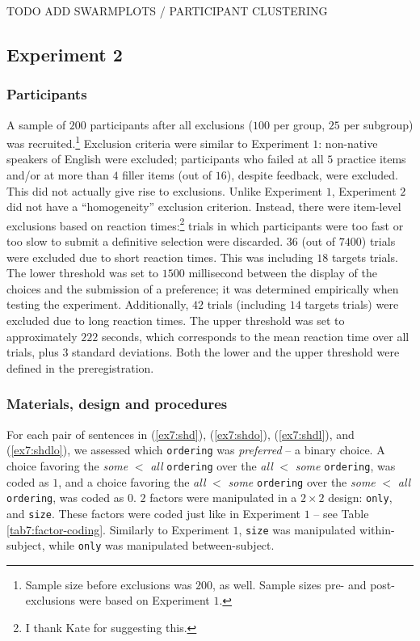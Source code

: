 TODO ADD SWARMPLOTS / PARTICIPANT CLUSTERING

\subsection{Experiment 2} 


\subsubsection{Participants}
A sample of $200$ participants after all exclusions ($100$ per group, $25$ per subgroup) was recruited.\footnote{Sample size before exclusions was $200$, as well. Sample sizes pre- and post-exclusions were based on Experiment $1$.} Exclusion criteria were similar to Experiment $1$: non-native speakers of English were excluded; participants who failed at all $5$ practice items and/or at more than $4$ filler items (out of $16$), despite feedback, were excluded. This did not actually give rise to exclusions. Unlike Experiment $1$, Experiment $2$ did not have a ``homogeneity'' exclusion criterion. Instead, there were item-level exclusions based on reaction times:\footnote{I thank Kate for suggesting this.} trials in which participants were too fast or too slow to submit a definitive selection were discarded. $36$ (out of $7400$) trials were excluded due to short reaction times. This was including $18$ targets trials. The lower threshold was set to $1500$ millisecond between the display of the choices and the submission of a preference; it was determined empirically when testing the experiment. Additionally, $42$ trials (including $14$ targets trials) were excluded due to long reaction times. The upper threshold was set to approximately $222$ seconds, which corresponds to the mean reaction time over all trials, plus $3$ standard deviations. Both the lower and the upper threshold were defined in the preregistration.

\subsubsection{Materials, design and procedures}

For each pair of sentences in (\ref{ex7:shd}), (\ref{ex7:shdo}), (\ref{ex7:shdl}), and (\ref{ex7:shdlo}), we assessed which \texttt{ordering} was \textit{preferred} -- a binary choice. A choice favoring the \textit{some} $<$ \textit{all} \texttt{ordering} over the \textit{all} $<$ \textit{some} \texttt{ordering}, was coded as $1$, and a choice favoring the \textit{all} $<$ \textit{some} \texttt{ordering} over the \textit{some} $<$ \textit{all} \texttt{ordering}, was coded as $0$. $2$ factors were manipulated in  a $2\times2$ design: \texttt{only}, and \texttt{size}. These factors were coded just like in Experiment $1$ -- see Table \ref{tab7:factor-coding}. Similarly to Experiment $1$, \texttt{size} was manipulated within-subject, while \texttt{only} was manipulated between-subject.\\

